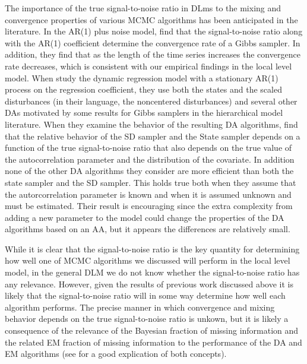 \documentclass[12pt]{article}
\begin{document}
The importance of the true signal-to-noise ratio in DLms to the mixing and convergence properties of various MCMC algorithms has been anticipated in the literature. In the AR(1) plus noise model, \citet{pitt1999analytic} find that the signal-to-noise ratio along with the AR(1) coefficient determine the convergence rate of a Gibbs sampler. In addition, they find that as the length of the time series increases the convergence rate decreases, which is consistent with our empirical findings in the local level model. When \citet{fruhwirth2004efficient} study the dynamic regression model with a stationary AR(1) process on the regression coefficient, they use both the states and the scaled disturbances (in their language, the noncentered disturbances) and several other DAs motivated by some results for Gibbs samplers in the hierarchical model literature. When they examine the behavior of the resulting DA algorithms, \citet{fruhwirth2004efficient} find that the relative behavior of the SD sampler and the State sampler depends on a function of the true signal-to-noise ratio that also depends on the true value of the autocorrelation parameter and the distribution of the covariate. In addition none of the other DA algorithms they consider are more efficient than both the state sampler and the SD sampler. This holds true both when they assume that the autorcorrelation parameter is known and when it is assumed unknown and must be estimated. Their result is encouraging since the extra complexity from adding a new parameter to the model could change the properties of the DA algorithms based on an AA, but it appears the differences are relatively small.

While it is clear that the signal-to-noise ratio is the key quantity for determining how well one of MCMC algorithms we discussed will perform in the local level model, in the general DLM we do not know whether the signal-to-noise ratio has any relevance. However, given the results of previous work discussed above it is likely that the signal-to-noise ratio will in some way determine how well each algorithm performs. The precise manner in which convergence and mixing behavior depends on the true signal-to-noise ratio is unkown, but it is likely a consequence of the relevance of the Bayesian fraction of missing information and the related EM fraction of missing information to the performance of the DA and EM algorithms (see \citet{van2001art} for a good explication of both concepts).

\end{document}
